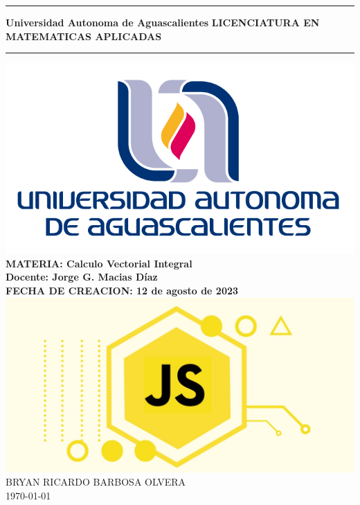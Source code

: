 \documentclass[10pt,a4paper]{article}
\begin{document}
\begin{titlepage}
\begin{center}
\vspace*{2\baselineskip}%
\hrule height 3pt
\vspace*{0.5\baselineskip}%
{\Huge \textbf{Universidad Autonoma de Aguascalientes}}
{\Large \textbf{LICENCIATURA EN MATEMATICAS APLICADAS}}
\vspace*{0.5\baselineskip}%
\hrule
\vspace*{0.5\baselineskip}%
\includegraphics[scale=0.5]{figuras/logo}
\vspace*{2\baselineskip} \\%
\textbf{\large MATERIA: Calculo Vectorial Integral} \\
\vspace*{1.5\baselineskip}
\textbf{\large Docente: Jorge G. Macias Díaz} \\
\vspace*{1.5\baselineskip}
\textbf{\large FECHA DE CREACION: 12 de agosto de 2023} \\  
\vspace*{3\baselineskip}
\includegraphics[scale=1.2]{figuras/imagen}
\vfill
BRYAN RICARDO BARBOSA OLVERA \\
\today \\

\end{center}
\end{titlepage}
\end{document}
